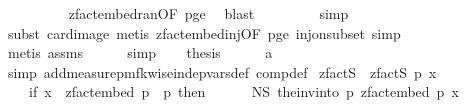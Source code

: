 \begin{isabellebody}
\ \ \ \ \ \ \ \ \isamarkupfalse%
\ zfact{\isacharunderscore}{\kern0pt}embed{\isacharunderscore}{\kern0pt}ran{\isacharbrackleft}{\kern0pt}OF\ p{\isacharunderscore}{\kern0pt}ge{\isacharunderscore}{\kern0pt}{}{\isacharbrackright}{\kern0pt}\ \isamarkupfalse%
\ blast\isanewline
\ \ \ \ \ \ \ \isamarkupfalse%
\ simp\isanewline
\ \ \ \ \ \ \isamarkupfalse%
\ {\isacharparenleft}{\kern0pt}subst\ card{\isacharunderscore}{\kern0pt}image{\isacharcomma}{\kern0pt}\ metis\ zfact{\isacharunderscore}{\kern0pt}embed{\isacharunderscore}{\kern0pt}inj{\isacharbrackleft}{\kern0pt}OF\ p{\isacharunderscore}{\kern0pt}ge{\isacharunderscore}{\kern0pt}{}{\isacharbrackright}{\kern0pt}\ inj{\isacharunderscore}{\kern0pt}on{\isacharunderscore}{\kern0pt}subset{\isacharcomma}{\kern0pt}\ simp{\isacharparenright}{\kern0pt}\isanewline
\ \ \ \ \ \isamarkupfalse%
\ {\isacharparenleft}{\kern0pt}metis\ assms{\isacharparenleft}{\kern0pt}{}{\isacharparenright}{\kern0pt}{\isacharparenright}{\kern0pt}\isanewline
\ \ \ \ \isamarkupfalse%
\ simp\isanewline
\isanewline
\ \ \isamarkupfalse%
\ {\isacharquery}{\kern0pt}thesis\isanewline
\ \ \ \ \isamarkupfalse%
\ a\ \isamarkupfalse%
\ {\isacharparenleft}{\kern0pt}simp\ add{\isacharcolon}{\kern0pt}measure{\isacharunderscore}{\kern0pt}pmf{\isachardot}{\kern0pt}k{\isacharunderscore}{\kern0pt}wise{\isacharunderscore}{\kern0pt}indep{\isacharunderscore}{\kern0pt}vars{\isacharunderscore}{\kern0pt}def\ comp{\isacharunderscore}{\kern0pt}def{\isacharparenright}{\kern0pt}\isanewline
{}\isamarkupfalse%
%
\endisatagproof
{\isafoldproof}%
%
\isadelimproof
%
\endisadelimproof
%
\isadelimdocument
%
\endisadelimdocument
%
\isatagdocument
%
\isamarkuptrue%
%
\endisatagdocument
{\isafolddocument}%
%
\isadelimdocument
%
\endisadelimdocument
{}\isamarkupfalse%
\ zfact\isactrlsub S\ \ {\isachardoublequoteopen}zfact\isactrlsub S\ p\ x\ {\isacharequal}{\kern0pt}\ {\isacharparenleft}{\kern0pt}\isanewline
\ \ \ \ if\ x\ {\isasymin}\ zfact{\isacharunderscore}{\kern0pt}embed\ p\ {\isacharbackquote}{\kern0pt}\ {\isacharbraceleft}{\kern0pt}{}{\isachardot}{\kern0pt}{\isachardot}{\kern0pt}{\isacharless}{\kern0pt}p{\isacharbraceright}{\kern0pt}\ then\isanewline
\ \ \ \ \ \ N\isactrlsub S\ {\isacharparenleft}{\kern0pt}the{\isacharunderscore}{\kern0pt}inv{\isacharunderscore}{\kern0pt}into\ {\isacharbraceleft}{\kern0pt}{}{\isachardot}{\kern0pt}{\isachardot}{\kern0pt}{\isacharless}{\kern0pt}p{\isacharbraceright}{\kern0pt}\ {\isacharparenleft}{\kern0pt}zfact{\isacharunderscore}{\kern0pt}embed\ p{\isacharparenright}{\kern0pt}\ x{\isacharparenright}{\kern0pt}\isanewline

\end{isabellebody}
